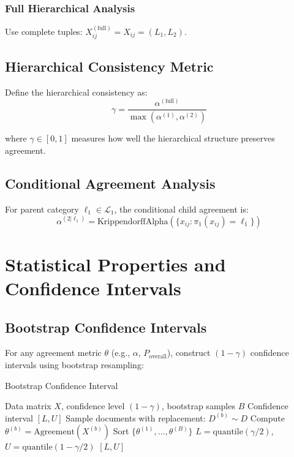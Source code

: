 \documentclass[11pt]{article}
\begin{document}
\subsubsection{Full Hierarchical Analysis}
Use complete tuples: $X^{(\text{full})}_{ij} = X_{ij} = (L_1, L_2)$.

\subsection{Hierarchical Consistency Metric}

Define the hierarchical consistency as:
\begin{equation}
\gamma = \frac{\alpha^{(\text{full})}}{\max(\alpha^{(1)}, \alpha^{(2)})}
\end{equation}

where $\gamma \in [0, 1]$ measures how well the hierarchical structure preserves agreement.

\subsection{Conditional Agreement Analysis}

For parent category $\ell_1 \in \mathcal{L}_1$, the conditional child agreement is:
\begin{equation}
\alpha^{(2|\ell_1)} = \text{KrippendorffAlpha}(\{x_{ij} : \pi_1(x_{ij}) = \ell_1\})
\end{equation}

\section{Statistical Properties and Confidence Intervals}

\subsection{Bootstrap Confidence Intervals}

For any agreement metric $\theta$ (e.g., $\alpha$, $P_{\text{overall}}$), construct $(1-\gamma)$ confidence intervals using bootstrap resampling:

\begin{algorithm}
\caption{Bootstrap Confidence Interval}
\begin{algorithmic}[1]
\REQUIRE Data matrix $X$, confidence level $(1-\gamma)$, bootstrap samples $B$
\ENSURE Confidence interval $[L, U]$
    \STATE Sample documents with replacement: $D^{(b)} \sim D$
    \STATE Compute $\theta^{(b)} = \text{Agreement}(X^{(b)})$
\ENDFOR
\STATE Sort $\{\theta^{(1)}, \ldots, \theta^{(B)}\}$
\STATE $L = \text{quantile}(\gamma/2)$, $U = \text{quantile}(1-\gamma/2)$
\STATE \RETURN $[L, U]$
\end{algorithmic}
\end{algorithm}
\end{document}
